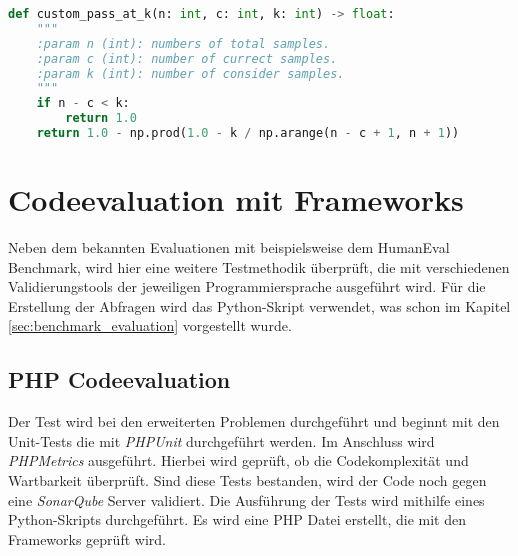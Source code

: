 \begin{lstlisting}[language=Python,label=lst:pass_at_k,caption={Berechnung der pass@k Metrik in Python}]
def custom_pass_at_k(n: int, c: int, k: int) -> float:
    """
    :param n (int): numbers of total samples.
    :param c (int): number of currect samples.
    :param k (int): number of consider samples.
    """
    if n - c < k:
        return 1.0
    return 1.0 - np.prod(1.0 - k / np.arange(n - c + 1, n + 1))
\end{lstlisting}


\section{Codeevaluation mit Frameworks}
Neben dem bekannten Evaluationen mit beispielsweise dem HumanEval Benchmark, wird hier eine weitere Testmethodik überprüft, die mit verschiedenen Validierungstools der jeweiligen Programmiersprache ausgeführt wird. Für die Erstellung der Abfragen wird das Python-Skript verwendet, was schon im Kapitel \ref{sec:benchmark_evaluation} vorgestellt wurde.

\subsection{PHP Codeevaluation}
Der Test wird bei den erweiterten Problemen durchgeführt und beginnt mit den Unit-Tests die mit \textit{PHPUnit} durchgeführt werden. Im Anschluss wird \textit{PHPMetrics} ausgeführt. Hierbei wird geprüft, ob die Codekomplexität und Wartbarkeit überprüft. Sind diese Tests bestanden, wird der Code noch gegen eine \textit{SonarQube} Server validiert. Die Ausführung der Tests wird mithilfe eines Python-Skripts durchgeführt. Es wird eine PHP Datei erstellt, die mit den Frameworks geprüft wird.




